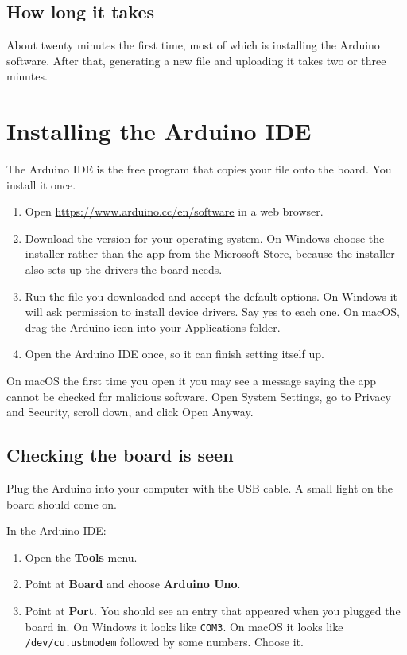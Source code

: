\documentclass[11pt,a4paper]{article}
\newenvironment{note}
  {\par\medskip\noindent
   \begin{lrbox}{\nfbox}\begin{minipage}{0.94\linewidth}\vspace{2pt}}
  {\vspace{2pt}\end{minipage}\end{lrbox}%
   \fcolorbox{leaf}{paper}{\usebox{\nfbox}}\par\medskip}
\begin{document}
\subsection{How long it takes}

About twenty minutes the first time, most of which is installing the Arduino
software. After that, generating a new file and uploading it takes two or three
minutes.

\section{Installing the Arduino IDE}

The Arduino IDE is the free program that copies your file onto the board. You
install it once.

\begin{enumerate}
  \item Open \url{https://www.arduino.cc/en/software} in a web browser.
  \item Download the version for your operating system. On Windows choose the
        installer rather than the app from the Microsoft Store, because the
        installer also sets up the drivers the board needs.
  \item Run the file you downloaded and accept the default options. On Windows
        it will ask permission to install device drivers. Say yes to each one.
        On macOS, drag the Arduino icon into your Applications folder.
  \item Open the Arduino IDE once, so it can finish setting itself up.
\end{enumerate}

\begin{note}
On macOS the first time you open it you may see a message saying the app cannot
be checked for malicious software. Open System Settings, go to Privacy and
Security, scroll down, and click Open Anyway.
\end{note}

\subsection{Checking the board is seen}

Plug the Arduino into your computer with the USB cable. A small light on the
board should come on.

In the Arduino IDE:

\begin{enumerate}
  \item Open the \textbf{Tools} menu.
  \item Point at \textbf{Board} and choose \textbf{Arduino Uno}.
  \item Point at \textbf{Port}. You should see an entry that appeared when you
        plugged the board in. On Windows it looks like \texttt{COM3}. On macOS
        it looks like \texttt{/dev/cu.usbmodem} followed by some numbers.
        Choose it.
\end{enumerate}
\end{document}
